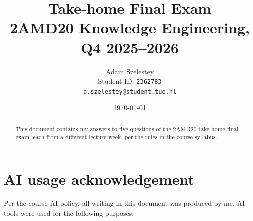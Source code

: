 \documentclass[11pt,a4paper]{article}
\title{Take-home Final Exam \\
       \large 2AMD20 Knowledge Engineering, Q4 2025--2026}
\author{Adam Szelestey \\ Student ID: \texttt{2362783} \\ \texttt{a.szelestey@student.tue.nl}}
\date{\today}
\begin{document}
\maketitle

\begin{abstract}
\noindent
This document contains my answers to five questions of the 2AMD20 take-home final exam,
each from a different lecture week, per the rules in the course syllabus.
\end{abstract}

\tableofcontents
\bigskip







%
%
% 
% 

\clearpage
\section*{AI usage acknowledgement}

Per the course AI policy, all writing in this document was produced by me.
AI tools were used for the following purposes:
\end{document}
